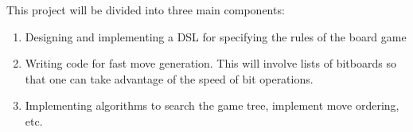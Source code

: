 \documentclass{scrartcl}
\begin{document}
This project will be divided into three main components:
\begin{enumerate}[nosep]
  \item Designing and implementing a DSL for specifying
        the rules of the board game
  \item Writing code for fast move generation.
        This will involve lists of bitboards so that one can
        take advantage of the speed of bit operations.
  \item Implementing algorithms to search the game tree,
        implement move ordering, etc.
\end{enumerate}


\end{document}
